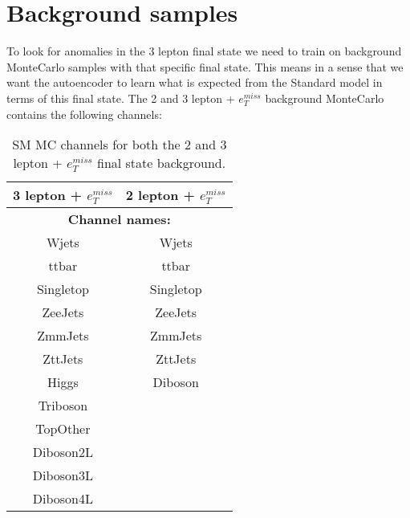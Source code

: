 \section{Background samples}

To look for anomalies in the 3 lepton final state we need to train on background MonteCarlo samples with that specific final state. 
This means in a sense that we want the autoencoder to learn what is expected from the Standard model in terms of this final state. 
The 2 and 3 lepton + $e_T^{miss}$ background MonteCarlo contains the following channels:

\begin{table}[H]
    \centering
    
    \begin{tabular}{|cc|}
    \hline
    \multicolumn{1}{|c|}{\textbf{3 lepton + $e_T^{miss}$}} & \textbf{2 lepton + $e_T^{miss}$} \\ \hline
    \multicolumn{2}{|c|}{\textbf{Channel names:}}                                             \\ \hline
    \multicolumn{1}{|c|}{Wjets}& Wjets                            \\ \hline
    \multicolumn{1}{|c|}{ttbar}& ttbar                            \\ \hline
    \multicolumn{1}{|c|}{Singletop}& Singletop                        \\ \hline
    \multicolumn{1}{|c|}{ZeeJets}  & ZeeJets                          \\ \hline
    \multicolumn{1}{|c|}{ZmmJets}                          & ZmmJets                          \\ \hline
    \multicolumn{1}{|c|}{ZttJets}                          & ZttJets                          \\ \hline
    \multicolumn{1}{|c|}{Higgs}                            & Diboson                          \\ \hline
    \multicolumn{1}{|c|}{Triboson}                         &                                  \\ \hline
    \multicolumn{1}{|c|}{TopOther}                         &                                  \\ \hline
    \multicolumn{1}{|c|}{Diboson2L}                        &                                  \\ \hline
    \multicolumn{1}{|c|}{Diboson3L}                        &                                  \\ \hline
    \multicolumn{1}{|c|}{Diboson4L}                        &                                  \\ \hline
\end{tabular}
\caption[SM MC channels]{SM MC channels for both the 2 and 3 lepton + $e_T^{miss}$ final state background. }
\label{tab:bkg_channels}
\end{table}


